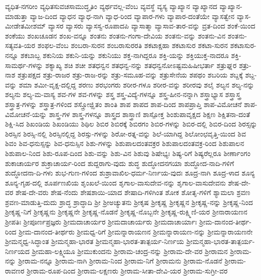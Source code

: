 {ವ್ಯಧಿತ-ನಗರೀಂ
ವ್ಯಧಿತಸುವಚಸಾಮುದ್ಧೃತಿಂ
ವ್ಯರ್ಥವಲ್ಲ-ವೆಂಬ
ವ್ಯವಸ್ಥೆ
ವ್ಯಸ್ಯ
ವ್ಯಾಖ್ಯಾನ
ವ್ಯಾಖ್ಯಾನದ
ವ್ಯಾಖ್ಯಾನ-ಮಾಡುತ್ತಾ
ವ್ಯಾಜ-ದಿಂದ
ವ್ಯಾಧನ
ವ್ಯಾಧ-ನಾಗಿ
ವ್ಯಾಧ-ರಿಂದ
ವ್ಯಾಪಾರ-ಗಳು
ವ್ಯಾಪಾರ-ದಂತೆಯೇ
ವ್ಯಾಸತ್ವೇನ
ವ್ಯಾಸ-ಮೀಡೇತಮೀಶಮ್
ವ್ಯಾಸರ
ವ್ಯಾಸರು
ವ್ಯಾಸಸ್ವ-ರೂಪಾದಪಿ
ವ್ಯಾಸಾತ್ಮಾ
ವ್ಯಾಸಾವ-ತಾರ-ವನ್ನು
ವ್ರತ-ದಿಂದ
ಶಂಕೆ-ಯಿಂದ
ಶಂಕೆಯು
ಶಂಖಚೂಡನ
ಶಂಖ-ವನ್ನೂ
ಶಂತನು
ಶಂತನು-ಗಂಗಾ-ದೇವಿಯ
ಶಂತನು-ವನ್ನು
ಶಂತನು-ವಿನ
ಶಂತನು-ಸತ್ಯವತಿ-ಯರ
ಶಂಫಲ-ವೆಂಬ
ಶಂಬರಾ-ಸುರನ
ಶಂಬರಾಸುರರತಿ
ಶಕಟಾಕ್ಷಹಾ
ಶಕಟಾಸುರ
ಶಕಟಾ-ಸುರನ
ಶಕಟಾಸುರ-ನನ್ನೂ
ಶಕಬಾಬ್ಬ
ಶಕುನಿಯ
ಶಕುನಿ-ಯನ್ನು
ಶಕುನಿಯು
ಶಕ್ತ-ನಾಗಿದ್ದರೂ
ಶಕ್ತಿ-ಯನ್ನು
ಶಕ್ತಿಯುಕ್ತ-ನಾದರೂ
ಶಕ್ತಿ-ಸಾಮರ್ಥ-ಗಳನ್ನು
ಶಕ್ಯಾಖ್ಯ
ಶಚಿ
ಶಚೀ
ಶತಧನ್ವನ
ಶತಧನ್ವ-ನನ್ನು
ಶತಧನ್ವನೋಽಷ್ಟಮಹಿಷೀಭರ್ತಾ
ಶತ್ರುಘ್ನರ
ಶತ್ರು-ನಾಶ
ಶತ್ರುಪಕ್ಷದ
ಶತ್ರು-ರಾಜರ
ಶತ್ರು-ರಾಜ-ರನ್ನು
ಶತ್ರು-ಸಮೂಹ-ವನ್ನು
ಶತ್ರುಸೇನೆಯ
ಶಪಥಂ
ಶಬರಿಯ
ಶಬ್ದಕ್ಕೆ
ಶಬ್ದ-ವನ್ನು
ಶಮಾ
ಶಮೀ-ವೃಕ್ಷ-ದಲ್ಲಿದ್ದ
ಶರಣು
ಶರಭಂಗರು
ಶರೀರ-ಗಳೂ
ಶರೀರ-ವನ್ನು
ಶರೀರವು
ಶಲೈ
ಶಲ್ಯನ
ಶಲ್ಯ-ನನ್ನು
ಶಲ್ಯನು
ಶಲ್ಯ-ಮ-ವಾಸ್ಯ
ಶವ-ಗಳ
ಶವ-ಗಳನ್ನು
ಶಸ್ತ್ರ
ಶಸ್ತ್ರ-ವಿದ್ಯೆ-ಗಳನ್ನೂ
ಶಸ್ತ್ರ-ಹೀನ-ನನ್ನಾಗಿ
ಶಸ್ತ್ರಾಭ್ಯಾಸ
ಶಸ್ತ್ರಾಸ್ತ್ರ
ಶಸ್ತ್ರಾತ್ರ-ಗಳನ್ನು
ಶಸ್ತ್ರಾತ್ರ-ಗಳಿಂದ
ಶಸ್ತ್ರೋಜ್ಝಿತಂ
ಶಾಂತಿ
ಶಾಪ
ಶಾಪದ
ಶಾಪ-ದಿಂದ
ಶಾಪಪ್ರಾಪ್ತಿ
ಶಾಪ-ವಿಮೋಚನೆ
ಶಾಪ-ವಿಮೋಚನೆ-ಯನ್ನು
ಶಾಸ್ತ್ರ-ಗಳ
ಶಾಸ್ತ್ರ-ಗಳನ್ನೂ
ಶಾಸ್ತ್ರದ
ಶಾಸ್ತ್ರಾಣಿ
ಶಾಸ್ಪೋಕ್ತ
ಶಿಂಶುಪಾವೃಕ್ಷದ
ಶಿಕ್ಷಣ
ಶಿಕ್ಷಿತನಾ-ದಂತೆ
ಶಿಕ್ಷಿ-ಸಿದ
ಶಿಖಂಡಿಯ
ಶಿಖಂಡಿಯು
ಶಿಥಿಲ
ಶಿಬಿರ
ಶಿಬಿರಕ್ಕೆ
ಶಿಬಿರಗಂ
ಶಿಬಿರ-ಗಳನ್ನು
ಶಿಬಿರ-ದಲ್ಲಿ
ಶಿಬಿರ-ದಿಂದ
ಶಿರಸ್ಸನ್ನು
ಶಿರಸ್ಸಿನ
ಶಿರಸ್ಸಿ-ನಲ್ಲಿ
ಶಿರಸ್ಸಿನಲ್ಲಿದ್ದ
ಶಿರಸ್ಸು-ಗಳನ್ನು
ಶಿರೋ-ರತ್ನ-ವನ್ನು
ಶಿಲೆ-ಯಾಗಿದ್ದ
ಶಿಲೋಂಛವೃತ್ತಿ-ಯಿಂದ
ಶಿವ
ಶಿವಂ
ಶಿವ-ಧನುಸ್ಸನ್ನು
ಶಿವ-ಧನುಸ್ಸಿನ
ಶಿಶು-ಗಳನ್ನು
ಶಿಶುಪಾಲದಂತವಕ್ರರ
ಶಿಶುಪಾಲದಂತವಕ್ರ-ರಿಂದ
ಶಿಶುಪಾಲನ
ಶಿಶುಪಾಲ-ನಿಂದ
ಶಿಶು-ರೂಪ-ದಿಂದ
ಶಿಶು-ವನ್ನು
ಶಿಶು-ವಿನ
ಶಿಶುವು
ಶಿಷೇಭ್ಯಃ
ಶಿಷ್ಯ-ರಿಗೆ
ಶಿಷ್ಯರೆಲ್ಲರೂ
ಶೀರ್ಣಾಂಗಂ
ಶುಕಾಚಾರ್ಯರ
ಶುಕ್ರಾಚಾರ್ಯ-ರಿಂದ
ಶುದ್ದರಾಗು-ವುದು
ಶುದ್ಧ
ಶುದ್ಧೋದನಗಯಾ
ಶುದ್ಧೋದ-ನಾದಿ-ಗಳಿಗೆ
ಶುದ್ಧೋದನಾ-ದಿ-ಗಳು
ಶುಭ-ಗುಣ-ಗಳಿಂದ
ಶುಶ್ರಾವಾಖಿಲ-ಧರ್ಮ-ನಿರ್ಣಯ-ವುದಃ
ಶೂದ್ರ-ನಾಗಿ
ಶೂದ್ರ-ಳಾದ
ಶೂನ್ಯ
ಶೂನ್ಯ-ಗೃಹ-ದಲ್ಲಿ
ಶೂರ್ಪಣಖಿಯ
ಶೃಂಖಲೆ-ಯಿಂದ
ಶೃಗಾಲ-ವಾಸುದೇವ-ನನ್ನು
ಶೃಗಾಲ-ವಾಸುದೇವನು
ಶೇಷ-ದೇ-ವರ
ಶೇಷ-ದೇ-ವರು
ಶೇಷ-ನೆಂದು
ಶೇಷಶಾಯಿ-ಯಾದ
ಶೇಷಾದಿ-ಗಳಿಗಿಂತ
ಶೋಕ
ಶೋತೃ-ಗಳಿಗೆ
ಶ್ಯಾಮಲಾ
ಶ್ರವಣ
ಶ್ರವಣ-ಮಾಡುತ್ತಿ-ದುದು
ಶ್ರಾದ್ಧ
ಶ್ರಾದ್ಧಾದಿ
ಶ್ರೀ
ಶ್ರೀಅಚ್ಯುತನು
ಶ್ರೀಕೃಷ
ಶ್ರೀಕೃಷ್ಣ
ಶ್ರೀಕೃಷ್ಣನ
ಶ್ರೀಕೃಷ್ಣ-ನನ್ನು
ಶ್ರೀಕೃಷ್ಣ-ನಿಂದ
ಶ್ರೀಕೃಷ್ಣ-ನಿಗೆ
ಶ್ರೀಕೃಷ್ಣನು
ಶ್ರೀಕೃಷ್ಣನೇ
ಶ್ರೀಕೃಷ್ಣ-ನೊಡನೆ
ಶ್ರೀಕೃಷ್ಣ-ನೊಬ್ಬನೇ
ಶ್ರೀಕೃಷ್ಣ-ರುಕ್ಷ್ಮಿಣಿ-ಯರ
ಶ್ರೀನಾರಾಯಣನ
ಶ್ರೀಪತಿಃ
ಶ್ರೀಪೂರ್ಣಪ್ರಜ್ಞರು
ಶ್ರೀಮದಾಚಾರ್ಯರ
ಶ್ರೀಮದಾಚಾರ್ಯರು
ಶ್ರೀಮದಾಚಾರ್ಯಾಃ
ಶ್ರೀಮ-ದಾನಂದ-ತೀರ್ಥ-ರಿಂದ
ಶ್ರೀಮ-ದಾನಂದ-ತೀರ್ಥರು
ಶ್ರೀಮಧ್ವ-ರಿಗೆ
ಶ್ರೀಮನ್ನಾರಾಯಣನ
ಶ್ರೀಮನ್ನಾರಾಯಣ-ನನ್ನು
ಶ್ರೀಮನ್ನಾರಾಯಣನೇ
ಶ್ರೀಮನ್ಮಧ್ವ-ಸಿದ್ಧಾಂತ
ಶ್ರೀಮನ್ಮಹಾ-ಭಾರತ
ಶ್ರೀಮನ್ಮಹಾ-ಭಾರತ-ತಾತ್ಪರ್ಯ-ನಿರ್ಣಯ
ಶ್ರೀಮನ್ಮಹಾ-ಭಾರತ-ತಾತ್ಪರ್ಯ-ನಿರ್ಣಯದ
ಶ್ರೀಮಹಾ-ಲಕ್ಷ್ಮಿಯೂ
ಶ್ರೀಮುಕುಂದನು
ಶ್ರೀರಾಮ-ಚಂದ್ರ-ನನ್ನು
ಶ್ರೀರಾಮ-ದೇ-ವರ
ಶ್ರೀರಾಮನ
ಶ್ರೀರಾಮ-ನನ್ನು
ಶ್ರೀರಾಮ-ನನ್ನೂ
ಶ್ರೀರಾಮ-ನಾಗಿ
ಶ್ರೀರಾಮ-ನಿಂದ
ಶ್ರೀರಾಮ-ನಿಗೆ
ಶ್ರೀರಾಮನು
ಶ್ರೀರಾಮ-ನೊಡನೆ
ಶ್ರೀರಾಮ-ರಾವಣರ
ಶ್ರೀರಾಮ-ರೂಪ-ದಿಂದ
ಶ್ರೀರಾಮ-ಲಕ್ಷಣರು
ಶ್ರೀರಾಮ-ಸೀತಾ-ದೇವಿ-ಯರ
ಶ್ರೀರಾಮ-ಸುಗ್ರೀ-ವರ
}

